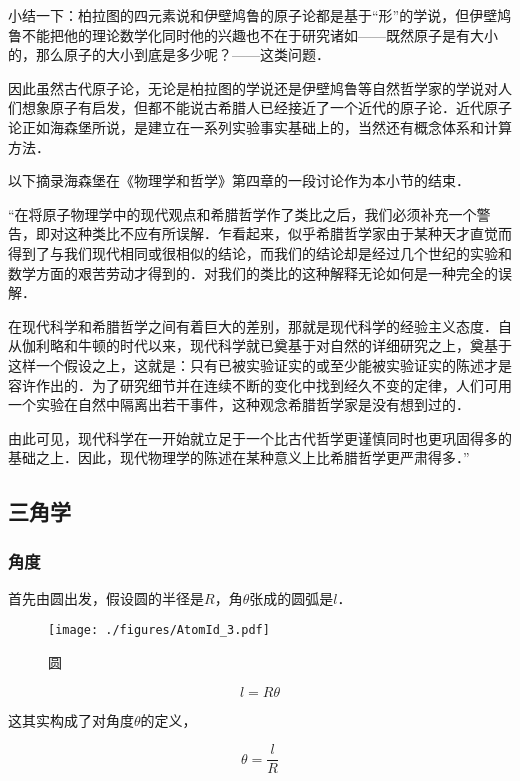 小结一下：柏拉图的四元素说和伊壁鸠鲁的原子论都是基于“形”的学说，但伊壁鸠鲁不能把他的理论数学化同时他的兴趣也不在于研究诸如——既然原子是有大小的，那么原子的大小到底是多少呢？——这类问题．

因此虽然古代原子论，无论是柏拉图的学说还是伊壁鸠鲁等自然哲学家的学说对人们想象原子有启发，但都不能说古希腊人已经接近了一个近代的原子论．近代原子论正如海森堡所说，是建立在一系列实验事实基础上的，当然还有概念体系和计算方法．

以下摘录海森堡在《物理学和哲学》第四章的一段讨论作为本小节的结束．

“在将原子物理学中的现代观点和希腊哲学作了类比之后，我们必须补充一个警告，即对这种类比不应有所误解．乍看起来，似乎希腊哲学家由于某种天才直觉而得到了与我们现代相同或很相似的结论，而我们的结论却是经过几个世纪的实验和数学方面的艰苦劳动才得到的．对我们的类比的这种解释无论如何是一种完全的误解．

在现代科学和希腊哲学之间有着巨大的差别，那就是现代科学的经验主义态度．自从伽利略和牛顿的时代以来，现代科学就已奠基于对自然的详细研究之上，奠基于这样一个假设之上，这就是：只有已被实验证实的或至少能被实验证实的陈述才是容许作出的．为了研究细节并在连续不断的变化中找到经久不变的定律，人们可用一个实验在自然中隔离出若干事件，这种观念希腊哲学家是没有想到过的．

由此可见，现代科学在一开始就立足于一个比古代哲学更谨慎同时也更巩固得多的基础之上．因此，现代物理学的陈述在某种意义上比希腊哲学更严肃得多．”

\subsection{三角学}

\subsubsection{角度}

首先由圆出发，假设圆的半径是$R$，角$\theta$张成的圆弧是$l$．

\begin{figure}[ht]
\centering
\texttt{[image: ./figures/AtomId\_3.pdf]}
\caption{圆} \label{AtomId_fig3}
\end{figure}

\begin{equation}
l = R \theta
\end{equation}

这其实构成了对角度$\theta$的定义，

\begin{equation}
\theta = \frac{l }{R }
\end{equation}

